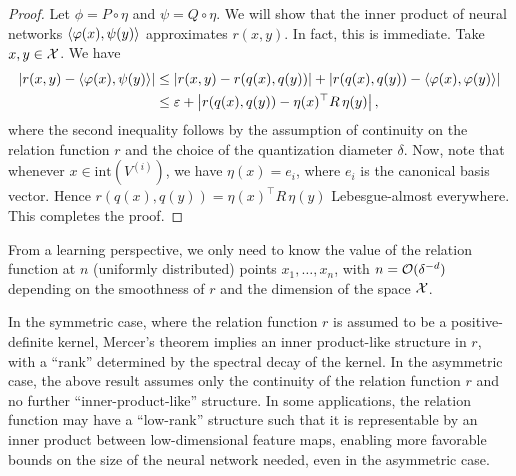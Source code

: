 \begin{proof}
    Let $\phi = P \circ \eta$ and $\psi = Q \circ \eta$. We will show that the inner product of neural networks $\left \langle \varphi(x), \psi(y) \right\rangle$ approximates $r(x, y)$. In fact, this is immediate. Take $x, y \in {\mathcal{X}}$. We have
    \begin{align*}
        \abs{r(x, y) - \iprod{\phi(x)}{\psi(y)}} &\leq \abs{r(x, y) - r(q(x), q(y))} + \abs{r(q(x), q(y)) - \iprod{\phi(x)}{\phi(y)}}\\
        &\leq \epsilon + \abs{r(q(x), q(y)) - \eta(x)^\top R\, \eta(y)},
    \end{align*}
    where the second inequality follows by the assumption of continuity on the relation function $r$ and the choice of the quantization diameter $\delta$. Now, note that whenever $x \in \mathrm{int}(V^{(i)})$, we have $\eta(x) = e_i$, where $e_i$ is the canonical basis vector. Hence $r(q(x), q(y)) = \eta(x)^\top R\, \eta(y)$ Lebesgue-almost everywhere. This completes the proof.
\end{proof}

\begin{remark}
    From a learning perspective, we only need to know the value of the relation function at $n$ (uniformly distributed) points $x_1, \ldots, x_n$, with $n = {\mathcal{O}}(\delta^{-d})$ depending on the smoothness of $r$ and the dimension of the space ${\mathcal{X}}$.
\end{remark}

\begin{remark}
    In the symmetric case, where the relation function $r$ is assumed to be a positive-definite kernel, Mercer's theorem implies an inner product-like structure in $r$, with a ``rank'' determined by the spectral decay of the kernel. In the asymmetric case, the above result assumes only the continuity of the relation function $r$ and no further ``inner-product-like'' structure. In some applications, the relation function may have a ``low-rank'' structure such that it is representable by an inner product between low-dimensional feature maps, enabling more favorable bounds on the size of the neural network needed, even in the asymmetric case.
\end{remark}



